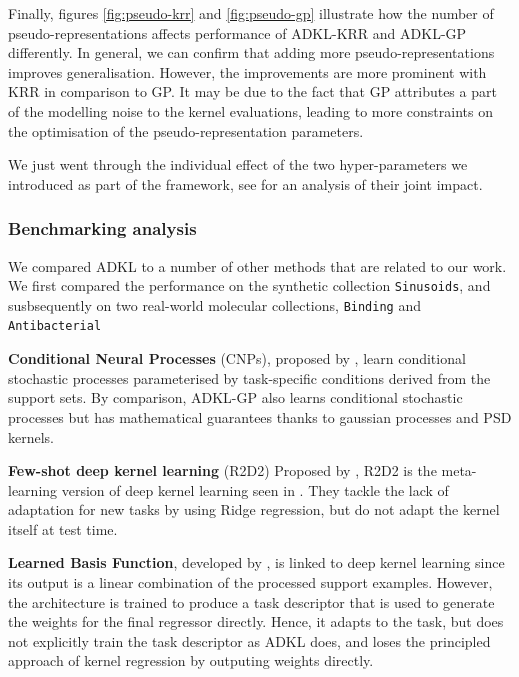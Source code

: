 \documentclass[11pt]{article}
\numberwithin{equation}{subsection}
\begin{document}
Finally, figures \ref{fig:pseudo-krr} and \ref{fig:pseudo-gp} illustrate how the number of pseudo-representations affects performance of ADKL-KRR and ADKL-GP differently.
In general, we can confirm that adding more pseudo-representations improves generalisation.
However, the improvements are more prominent with KRR in comparison to GP. It may be due to the fact that GP attributes a part of the modelling noise to the kernel evaluations, leading to more constraints on the optimisation of the pseudo-representation parameters.

We just went through the individual effect of the two hyper-parameters we introduced as part of the framework, see  for an analysis of their joint impact.


\subsubsection{Benchmarking analysis}

We compared ADKL to a number of other methods that are related to our work. We first compared the performance on the synthetic collection \texttt{Sinusoids}, and susbsequently on two real-world molecular collections, \texttt{Binding} and \texttt{Antibacterial}

\textbf{Conditional Neural Processes} (CNPs), proposed by \citet{garnelo2018conditional}, learn conditional stochastic processes parameterised by task-specific conditions derived from the support sets. By comparison, ADKL-GP also learns conditional stochastic processes but has mathematical guarantees thanks to gaussian processes and PSD kernels.

\textbf{Few-shot deep kernel learning} (R2D2) Proposed by \citet{bertinetto2018meta}, R2D2 is the meta-learning version of deep kernel learning seen in . They tackle the lack of adaptation for new tasks by using Ridge regression, but do not adapt the kernel itself at test time.

\textbf{Learned Basis Function}, developed by \citet{Loo2019regression}, is linked to deep kernel learning since its output is a linear combination of the processed support examples. However, the architecture is trained to produce a task descriptor that is used to generate the weights for the final regressor directly. Hence, it adapts to the task, but does not explicitly train the task descriptor as ADKL does, and loses the principled approach of kernel regression by outputing weights directly.

\end{document}
